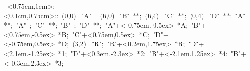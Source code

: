 

\hbox{
\xy    <0.75cm,0cm>:<0.1cm,0.75cm>::
       (0,0)="A" ; (6,0)="B" **\dir{-}; 
       (6,4)="C" **\dir{-}; (0,4)="D" **\dir{-}; "A" **\dir{-};
       "A" ; "C" **\dir{-}; "B" ; "D" **\dir{-};
       "A"+<-0.75em,-0.5ex> *{A};
       "B"+<0.75em,-0.5ex> *{B};
       "C"+<0.75em,0.5ex> *{C};
       "D"+<-0.75em,0.5ex> *{D};
       (3,2)="R"; "R"+<0.2em,1.75ex> *{R};
       "D"+<2.1em,-1.25ex> *{1};
       "D"+<0.3em,-2.3ex> *{2};
       "B"+<-2.1em,1.25ex> *{4};
       "B"+<-0.3em,2.3ex> *{3};
       \endxy}
	   
